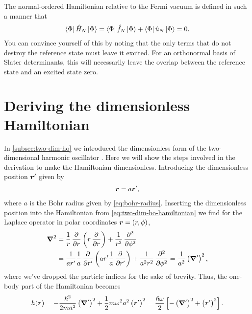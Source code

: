        The normal-ordered Hamiltonian relative to the Fermi vacuum is defined
        in such a manner that
        \begin{align}
            \bra{\Phi}\hat{H}_N\ket{\Phi}
            = \bra{\Phi}\hat{f}_N\ket{\Phi}
            + \bra{\Phi}\hat{u}_N\ket{\Phi}
            = 0.
        \end{align}
        You can convince yourself of this by noting that the only terms that
        do not destroy the reference state must leave it excited.
        For an orthonormal basis of Slater determinants, this will necessarily
        leave the overlap between the reference state and an excited state zero.

    \section{Deriving the dimensionless Hamiltonian}
        \label{app:two-dim-ho-dimensionless}
        In \autoref{subsec:two-dim-ho} we introduced the dimensionless form of
        the two-dimensional harmonic oscillator \cite{anisimovas1998energy}.
        Here we will show the steps involved in the derivation to make the
        Hamiltonian dimensionless.
        Introducing the dimensionless position $\boldsymbol{r}'$ given by
        \begin{align}
            \boldsymbol{r} = a \boldsymbol{r}',
        \end{align}
        where $a$ is the Bohr radius given by \autoref{eq:bohr-radius}.
        Inserting the dimensionless position into the Hamiltonian from
        \autoref{eq:two-dim-ho-hamiltonian} we find for the Laplace operator in
        polar coordinates $\boldsymbol{r} = (r, \phi)$,
        \begin{align}
            \vfg{\nabla}^2
            &= \frac{1}{r}\dpd{}{r}\para{
                r\dpd{}{r}
            }
            + \frac{1}{r^2}\dpd[2]{}{\phi}
            \\
            &= \frac{1}{a r'}\frac{1}{a}\dpd{}{r'}\para{
                a r' \frac{1}{a}\dpd{}{r'}
            }
            + \frac{1}{a^2 r^2}\dpd[2]{}{\phi}
            = \frac{1}{a^2}\para{\vfg{\nabla}'}^2,
        \end{align}
        where we've dropped the particle indices for the sake of brevity.
        Thus, the one-body part of the Hamiltonian becomes
        \begin{align}
            h(\boldsymbol{r})
            = -\frac{\hslash^2}{2m a^2}\left( \boldsymbol{\nabla}' \right)^2
            + \frac{1}{2} m \omega^2 a^2 \left( \boldsymbol{r}' \right)^2
            = \frac{\hslash\omega}{2}\left[ 
                -\left( \boldsymbol{\nabla}' \right)^2
                + \left( \boldsymbol{r}' \right)^2
             \right].
        \end{align}
